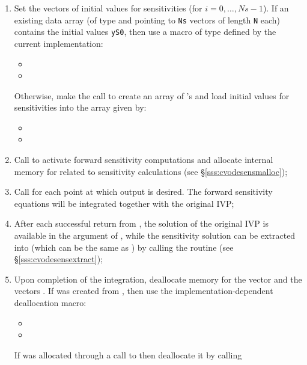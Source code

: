 \begin{enumerate}
\item
  Set the  vectors  of  initial values
  for sensitivities (for $i=0,\ldots,Ns-1$). 
  If an existing data array  (of type  and pointing to
  {\tt Ns} vectors of length {\tt N} each) contains the initial values
  {\tt yS0}, then use a macro of type  defined by the current 
  {\nvector} implementation:
  \begin{itemize}
  \item {\s} 
  \item {\p} 
  \end{itemize}
  Otherwise, make the call  
  to create an array of 's and load initial values for 
  sensitivities  into the array given by:
  \begin{itemize}
  \item {\s}
  \item {\p}
  \end{itemize}
  
\item
  Call \id{(\ldots);} to activate forward 
  sensitivity computations and allocate internal
  memory for {\cvodes} related to sensitivity calculations
  (see \S\ref{sss:cvodesensmalloc});
  
\item
  Call  for each point at which output is desired. The 
  forward sensitivity equations will be integrated together with 
  the original IVP;
  
\item
  After each successful return from , the solution of the
  original IVP is available in the  argument of ,
  while the sensitivity solution can be extracted into  (which can 
  be the same as ) by calling the routine 
  (see \S\ref{sss:cvodesensextract});
  
\item 
  Upon completion of the integration, deallocate memory for the vector 
  and the vectors . If  was created from , then use
  the implementation-dependent {\nvector} deallocation macro:
  \begin{itemize}
  \item {\s}
  \item {\p}
  \end{itemize}
  If  was allocated through a call to  then deallocate
  it by calling 
  

\end{enumerate}
